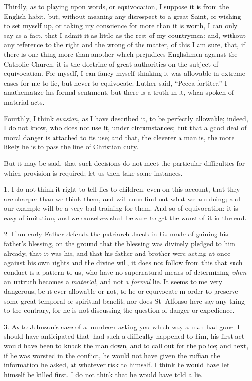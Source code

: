 Thirdly, as to playing upon words, or equivocation, I suppose it is
from the English habit, but, without meaning any disrespect to a great
Saint, or wishing to set myself up, or taking my conscience for more
than it is worth, I can only say as a fact, that I admit it as little as
the rest of my countrymen: and, without any reference to the right and
the wrong of the matter, of this I am sure, that, if there is one thing
more than another which prejudices Englishmen against the Catholic
Church, it is the doctrine of great authorities on the subject of
equivocation. For myself, I can fancy myself thinking it was allowable
in extreme cases for me to lie, but never to equivocate. Luther said,
``Pecca fortiter.'' I anathematize his formal
sentiment, but there is a truth in it, when spoken of material acts.

Fourthly, I think \emph{evasion}, as I have described it, to be
perfectly allowable; indeed, I do not know, who does not use it, under
circumstances; but that a good deal of moral danger is attached to its
use; and that, the cleverer a man is, the more likely he is to pass the
line of Christian duty.

But it may be said, that such decisions do not meet the particular
difficulties for which provision is required; let us then take some
instances.

1. I do not think it right to tell lies to children, even on this
account, that they are sharper than we think them, and will soon find
out what we are doing; and our example will be a very bad training for
them. And so of equivocation: it is easy of imitation, and we ourselves
shall be sure to get the worst of it in the end.

2. If an early Father defends the patriarch Jacob in his mode of
gaining his father's blessing, on the ground that the blessing was
divinely pledged to him already, that it was his, and that his father
and brother were acting at once against his own rights and the divine
will, it does not follow from this that such conduct is a pattern to us,
who have no supernatural means of determining \emph{when} an untruth
becomes a \emph{material}, and not a \emph{formal} lie. It seems to me
very dangerous, be it ever allowable or not, to lie or
equivocate in order to preserve some great temporal or spiritual
benefit; nor does St. Alfonso here say any thing to the contrary, for he
is not discussing the question of danger or expedience.

3. As to Johnson's case of a murderer asking you which way a man had
gone, I should have anticipated that, had such a difficulty happened to
him, his first act would have been to knock the man down, and to call
out for the police; and next, if he was worsted in the conflict, he
would not have given the ruffian the information he asked, at whatever
risk to himself. I think he would have let himself be killed first. I do
not think that he would have told a lie.

